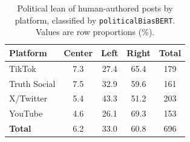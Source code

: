 \begin{table}[h]
\centering
\caption{Political lean of human-authored posts by platform, classified by
\texttt{politicalBiasBERT}. Values are row proportions (\%).}
\begin{tabular}{lcccc}
\toprule
\textbf{Platform} & \textbf{Center} & \textbf{Left} & \textbf{Right} & \textbf{Total} \\
\midrule
TikTok & 7.3 & 27.4 & 65.4 & 179 \\
Truth Social & 7.5 & 32.9 & 59.6 & 161 \\
X/Twitter & 5.4 & 43.3 & 51.2 & 203 \\
YouTube & 4.6 & 26.1 & 69.3 & 153 \\
\midrule
\textbf{Total} & 6.2 & 33.0 & 60.8 & 696 \\
\bottomrule
\end{tabular}
\end{table}
